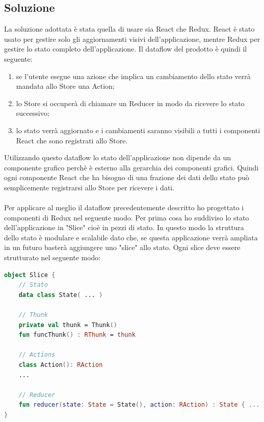 \subsection{Soluzione}
La soluzione adottata è stata quella di usare sia React che Redux. React è stato usato per gestire solo gli aggiornamenti visivi dell'applicazione, mentre Redux per gestire lo stato completo dell'applicazione. Il dataflow del prodotto è quindi il seguente:
\begin{enumerate}
	\item se l'utente esegue una azione che implica un cambiamento dello stato verrà mandata allo Store una Action;
	\item lo Store si occuperà di chiamare un Reducer in modo da ricevere lo stato successivo;
	\item lo stato verrà aggiornato e i cambiamenti saranno visibili a tutti i componenti React che sono registrati allo Store.
\end{enumerate}
Utilizzando questo dataflow lo stato dell'applicazione non dipende da un componente grafico perchè è esterno alla gerarchia dei componenti grafici. Quindi ogni componente React che ha bisogno di una frazione dei dati dello stato può semplicemente registrarsi allo Store per ricevere i dati.
\\
\\
Per applicare al meglio il dataflow precedentemente descritto ho progettato i componenti di Redux nel seguente modo. Per prima cosa ho suddiviso lo stato dell'applicazione in "Slice" cioè in pezzi di stato. In questo modo la struttura dello stato è modulare e scalabile dato che, se questa applicazione verrà ampliata in un futuro basterà aggiungere uno "slice" allo stato. Ogni slice deve essere strutturato nel seguente modo:
\begin{lstlisting}[caption={Esempio Slice}, label={lst:bodycells}, language=Kotlin]
object Slice {
	// Stato
	data class State( ... )
	
	// Thunk
	private val thunk = Thunk()
	fun funcThunk() : RThunk = thunk
	
	// Actions
	class Action(): RAction
	...
	
	// Reducer
	fun reducer(state: State = State(), action: RAction) : State { ... }
}
\end{lstlisting}

